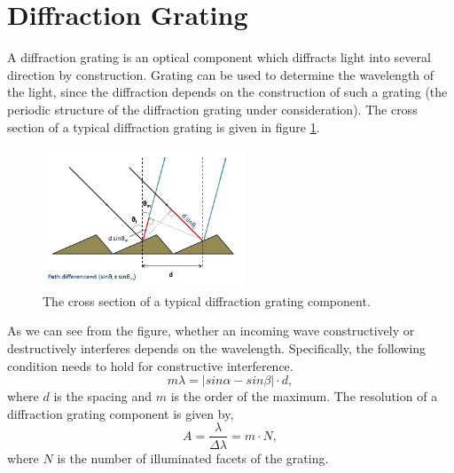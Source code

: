 \section{Diffraction Grating}
A diffraction grating is an optical component which diffracts light into several direction by construction. Grating can be used to determine the wavelength of the light, since the diffraction depends on the construction of such a grating (the periodic structure of the diffraction grating under consideration). The cross section of a typical diffraction grating is given in figure \ref{fig:diffraction}.\\
\begin{figure}[h!]
    \centering
    \includegraphics[width = 6cm]{diffraction.jpg}
    \caption{The cross section of a typical diffraction grating component\cite{diffraction}.}
    \label{fig:diffraction}
\end{figure}
As we can see from the figure, whether an incoming wave constructively or destructively interferes depends on the wavelength. Specifically, the following condition needs to hold for constructive interference.
\begin{equation}
    m\lambda = \lvert sin\alpha - sin \beta \rvert \cdot d,
\end{equation}
where $d$ is the spacing and $m$ is the order of the maximum. The resolution of a diffraction grating component is given by,
\begin{equation}
    A = \frac{\lambda}{\Delta \lambda} = m \cdot N,
\end{equation}
where $N$ is the number of illuminated facets of the grating.

